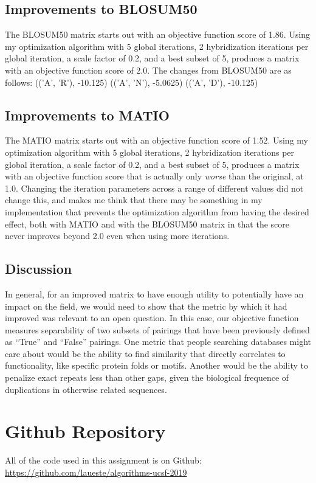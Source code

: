 \documentclass{article}
\begin{document}
\subsection{Improvements to BLOSUM50}
The BLOSUM50 matrix starts out with an objective function score of 1.86. Using my optimization algorithm 
with 5 global iterations, 2 hybridization iterations per global iteration, a scale factor of 0.2, and a best subset of 5, produces a matrix with an objective function score of 2.0. The changes from BLOSUM50 are as follows:
(('A', 'R'), -10.125)
(('A', 'N'), -5.0625)
(('A', 'D'), -10.125) 


\subsection{Improvements to MATIO}
The MATIO matrix starts out with an objective function score of 1.52. Using my optimization algorithm 
with 5 global iterations, 2 hybridization iterations per global iteration, a scale factor of 0.2, and a best subset of 5, produces a matrix with an objective function score that is actually only {\it worse} than the original, at 1.0. Changing the iteration parameters across a range of different values did not change this, and makes me think that there may be something in my implementation that prevents the optimization algorithm from having the desired effect, both with MATIO and with the BLOSUM50 matrix in that the score never improves beyond 2.0 even when using more iterations.

\subsection{Discussion}
In general, for an improved matrix to have enough utility to potentially have an impact on the field, we would need to show that the metric by which it had improved was relevant to an open question. In this case, our objective function measures separability of two subsets of pairings that have been previously defined as ``True'' and ``False'' pairings. One metric that people searching databases might care about would be the ability to find similarity that directly correlates to functionality, like specific protein folds or motifs. Another would be the ability to penalize exact repeats less than other gaps, given the biological frequence of duplications in otherwise related sequences. 


\section{Github Repository}
All of the code used in this assignment is on Github: \url{https://github.com/laueste/algorithms-ucsf-2019}
\end{document}
